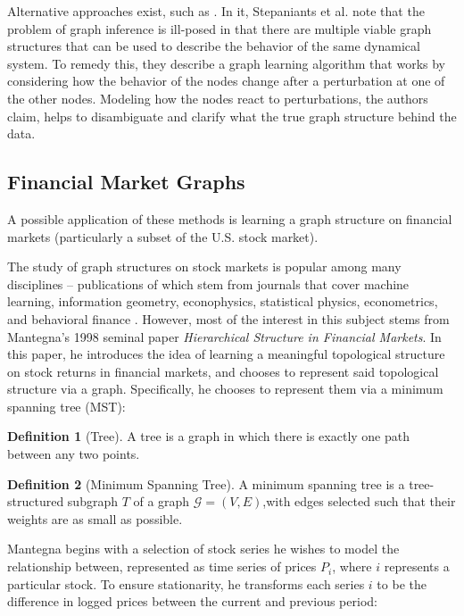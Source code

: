 \documentclass[12pt]{article}
\theoremstyle{definition}
\newtheorem{definition}{Definition}[section]
\begin{document}
Alternative approaches exist, such as \cite{PhysRevInferringCausalNetworksPerturbations}. In it, Stepaniants et al. note that the problem of graph inference is ill-posed in that there are multiple viable graph structures that can be used to describe the behavior of the same dynamical system. To remedy this, they describe a graph learning algorithm that works by considering how the behavior of the nodes change after a perturbation at one of the other nodes. Modeling how the nodes react to perturbations, the authors claim, helps to disambiguate and clarify what the true graph structure behind the data.

\subsection{Financial Market Graphs}
\label{subsec:financialMarketGraphs}

A possible application of these methods is learning a graph structure on financial markets (particularly a subset of the U.S. stock market). 

The study of graph structures on stock markets is popular among many disciplines -- publications of which stem from journals that cover machine learning, information geometry, econophysics, statistical physics, econometrics, and behavioral finance \cite{networkSurveyFinance}. However, most of the interest in this subject stems from Mantegna's 1998 seminal paper \cite{mantegnaSeminalPaper} \textit{Hierarchical Structure in Financial Markets}. In this paper, he introduces the idea of learning a meaningful topological structure on stock returns in financial markets, and chooses to represent said topological structure via a graph. Specifically, he chooses to represent them via a minimum spanning tree (MST):

\begin{definition}[Tree]
A tree is a graph in which there is exactly one path between any two points.
\end{definition}

\begin{definition}[Minimum Spanning Tree]
A minimum spanning tree is a tree-structured subgraph $T$ of a graph $\mathcal{G} = (V, E)$,with edges selected such that their weights are as small as possible.
\end{definition}


Mantegna begins with a selection of stock series he wishes to model the relationship between, represented as time series of prices $P_i$, where $i$ represents a particular stock. To ensure stationarity, he transforms each series $i$ to be the difference in logged prices between the current and previous period:
\end{document}

